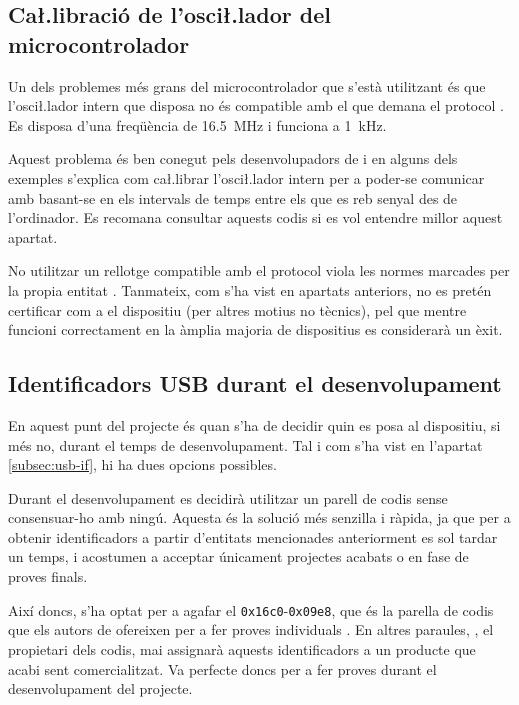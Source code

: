 \subsection{Ca\l.libració de l'osci\l.lador del microcontrolador}

Un dels problemes més grans del microcontrolador que s'està utilitzant és que
l'osci\l.lador intern que disposa no és compatible amb el que demana el
protocol . Es disposa d'una freqüència de
\SI[round-mode=places,round-precision=1]{16.5}{\mega\hertz} i
 funciona a
\SI[round-mode=places,round-precision=0]{1}{\kilo\hertz}.

Aquest problema és ben conegut pels desenvolupadors de  i en alguns
dels exemples s'explica com ca\l.librar l'osci\l.lador intern per a poder-se
comunicar amb  basant-se en els intervals de temps entre els que es
reb senyal des de l'ordinador. Es recomana consultar aquests codis
\cite{Vusb} si es vol entendre millor aquest apartat.

No utilitzar un rellotge compatible amb el protocol  viola les normes
marcades per la propia entitat . Tanmateix, com s'ha vist en
apartats anteriors, no es pretén certificar com a  el dispositiu
(per altres motius no tècnics), pel que mentre funcioni correctament en la
àmplia majoria de dispositius es considerarà un èxit.

\subsection{Identificadors USB durant el desenvolupament}

En aquest punt del projecte és quan s'ha de decidir
quin  es posa al dispositiu, si més no, durant el temps de
desenvolupament. Tal i com s'ha vist en l'apartat \ref{subsec:usb-if}, hi ha dues
opcions possibles.

Durant el desenvolupament es decidirà utilitzar un parell de codis sense
consensuar-ho amb ningú. Aquesta és la solució més senzilla i ràpida, ja que per
a obtenir identificadors a partir d'entitats mencionades anteriorment es sol
tardar un temps, i acostumen a acceptar únicament projectes acabats o en fase
de proves finals.

Així doncs, s'ha optat per a agafar el 
\texttt{0x16c0}-\texttt{0x09e8}, que és la
parella de codis que els autors de  ofereixen per a fer proves
individuals \cite{Vusb}. En altres paraules, , el propietari dels
codis, mai assignarà aquests identificadors a un producte que acabi sent
comercialitzat. Va perfecte doncs per a fer proves durant el desenvolupament del
projecte.

